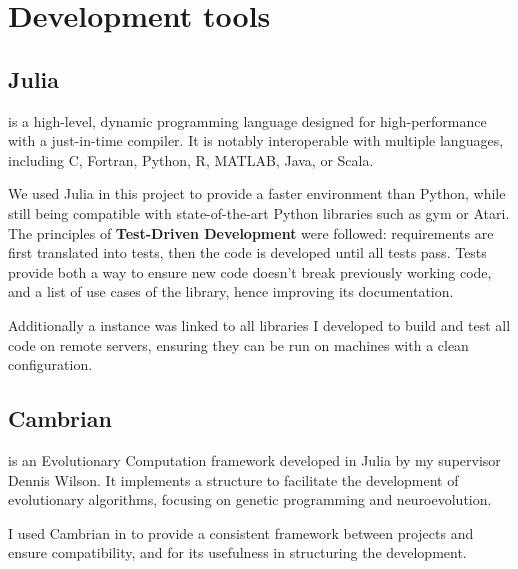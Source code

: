 \section{Development tools}
\subsection{Julia}
    
\href{https://julialang.org/}{} is a high-level, dynamic programming language designed for high-performance with a just-in-time compiler. It is notably interoperable with multiple languages, including C, Fortran, Python, R, MATLAB, Java, or Scala. \cite{julia-lang}

We used Julia in this project to provide a faster environment than Python, while still being compatible with state-of-the-art Python libraries such as gym or Atari.
\\

The principles of \textbf{Test-Driven Development} were followed: requirements are first translated into tests, then the code is developed until all tests pass. Tests provide both a way to ensure new code doesn't break previously working code, and a list of use cases of the library, hence improving its documentation.

Additionally a \href{https://travis-ci.org/}{} instance was linked to all libraries I developed to build and test all code on remote servers, ensuring they can be run on machines with a clean configuration. 

\subsection{Cambrian}

\href{https://github.com/d9w/Cambrian.jl}{} is an Evolutionary Computation framework developed in Julia by my supervisor Dennis Wilson. It implements a structure to facilitate the development of evolutionary algorithms, focusing on genetic programming and neuroevolution. 

I used Cambrian in to provide a consistent framework between projects and ensure compatibility, and for its usefulness in structuring the development.

